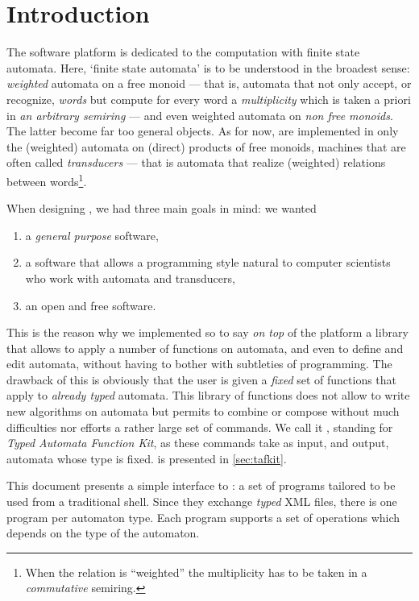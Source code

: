 \chapter*{Introduction}
\label{sec:intro}

The \Vauc software platform is dedicated to the computation with
finite state automata.  Here, `finite state automata' is to be
understood in the broadest sense: \emph{weighted} automata on a free
monoid --- that is, automata that not only accept, or recognize,
\emph{words} but compute for every word a \emph{multiplicity} which is
taken a priori in \emph{an arbitrary semiring} --- and even weighted
automata on \emph{non free monoids}.  The latter become far too
general objects.  As for now, are implemented in \Vauc only the
(weighted) automata on (direct) products of free monoids, machines
that are often called \emph{transducers} --- that is automata that
realize (weighted) relations between words\footnote{When the relation
  is ``weighted'' the multiplicity has to be taken in a
  \emph{commutative} semiring.}.

When designing \Vauc, we had three main goals in mind: we wanted
\begin{enumerate}
\item a \emph{general purpose} software,
\item a software that allows a programming style natural to computer
  scientists who work with automata and transducers,
\item  an open and free software.
\end{enumerate}

This is the reason why we implemented so to say \emph{on top} of the
\Vauc platform a library that allows to apply a number of functions on
automata, and even to define and edit automata, without having to
bother with subtleties of \Cxx programming.  The drawback of this is
obviously that the user is given a \emph{fixed} set of functions that
apply to \emph{already typed} automata.  This library of functions
does not allow to write new algorithms on automata but permits to
combine or compose without much difficulties nor efforts a rather
large set of commands.  We call it \tafkit, standing for \emph{Typed
  Automata Function Kit}, as these commands take as input, and output,
automata whose type is fixed.  \tafkit is presented in
\autoref{sec:tafkit}.


This document presents a simple interface to \Vauc: a set of programs
tailored to be used from a traditional shell.  Since they exchange
\emph{typed} XML files, there is one program per automaton type.  Each
program supports a set of operations which depends on the type of the
automaton.

